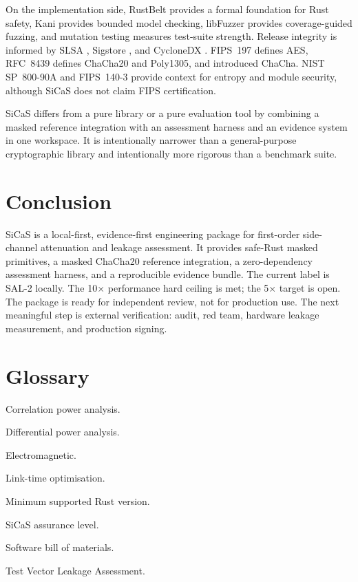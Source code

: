 \documentclass[11pt,a4paper]{article}
\theoremstyle{plain}
\theoremstyle{definition}
\theoremstyle{remark}
\begin{document}
On the implementation side, RustBelt \citep{jung2018rustbelt} provides a formal
foundation for Rust safety, Kani \citep{kani} provides bounded model checking, libFuzzer
\citep{libfuzzer} provides coverage-guided fuzzing, and mutation testing
\citep{jia2011mutation} measures test-suite strength. Release integrity is informed by
SLSA \citep{slsa}, Sigstore \citep{sigstore}, and CycloneDX \citep{cyclonedx}. FIPS~197
\citep{fips197} defines AES, RFC~8439 \citep{rfc8439} defines ChaCha20 and Poly1305,
and \citet{bernstein2008chacha} introduced ChaCha. NIST SP~800-90A
\citep{nist80090a} and FIPS~140-3 \citep{fips1403} provide context for entropy and
module security, although SiCaS does not claim FIPS certification.

SiCaS differs from a pure library or a pure evaluation tool by combining a masked
reference integration with an assessment harness and an evidence system in one
workspace. It is intentionally narrower than a general-purpose cryptographic library
and intentionally more rigorous than a benchmark suite.

\section{Conclusion}\label{sec:conclusion}

SiCaS is a local-first, evidence-first engineering package for first-order side-channel
attenuation and leakage assessment. It provides safe-Rust masked primitives, a masked
ChaCha20 reference integration, a zero-dependency assessment harness, and a reproducible
evidence bundle. The current label is SAL-2 locally. The 10$\times$ performance hard
ceiling is met; the 5$\times$ target is open. The package is ready for independent
review, not for production use. The next meaningful step is external verification:
audit, red team, hardware leakage measurement, and production signing.

\appendix

\section{Glossary}

\begin{description}[leftmargin=1.5em]
  \item[CPA] Correlation power analysis.
  \item[DPA] Differential power analysis.
  \item[EM] Electromagnetic.
  \item[LTO] Link-time optimisation.
  \item[MSRV] Minimum supported Rust version.
  \item[SAL] SiCaS assurance level.
  \item[SBOM] Software bill of materials.
  \item[TVLA] Test Vector Leakage Assessment.
\end{description}
\end{document}
